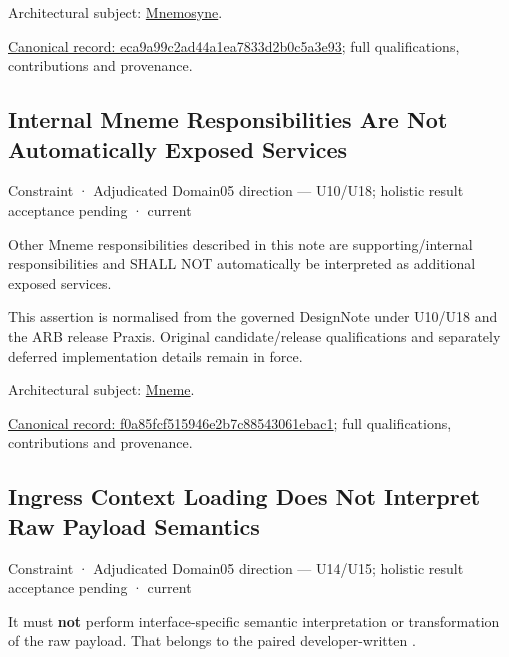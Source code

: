 Architectural subject: \hyperref[element:7985e647bf9e4ca3ba70faf9e3e4ae02]{Mnemosyne}.


{\footnotesize \href{../../../../continuum/motivation/constraint/eca9a99c2ad44a1ea7833d2b0c5a3e93.md}{Canonical record: eca9a99c2ad44a1ea7833d2b0c5a3e93}; full qualifications, contributions and provenance.}\par
\subsection{Internal Mneme Responsibilities Are Not Automatically Exposed Services}

\label{element:f0a85fcf515946e2b7c88543061ebac1}
{\small Constraint · Adjudicated Domain05 direction — U10/U18; holistic result acceptance pending · current}\par

Other Mneme responsibilities described in this note are supporting/internal responsibilities and SHALL NOT automatically be interpreted as additional exposed services.



This assertion is normalised from the governed DesignNote under U10/U18 and the ARB release Praxis. Original candidate/release qualifications and separately deferred implementation details remain in force.



Architectural subject: \hyperref[element:1af8a56358f7429fabfb57be66542a99]{Mneme}.


{\footnotesize \href{../../../../continuum/motivation/constraint/f0a85fcf515946e2b7c88543061ebac1.md}{Canonical record: f0a85fcf515946e2b7c88543061ebac1}; full qualifications, contributions and provenance.}\par
\subsection{Ingress Context Loading Does Not Interpret Raw Payload Semantics}

\label{element:f5af90e09e9a422d9b1c9a7f3c44090f}
{\small Constraint · Adjudicated Domain05 direction — U14/U15; holistic result acceptance pending · current}\par

It must \textbf{not} perform interface-specific semantic interpretation or transformation of the raw payload. That belongs to the paired developer-written \texttt{}.



